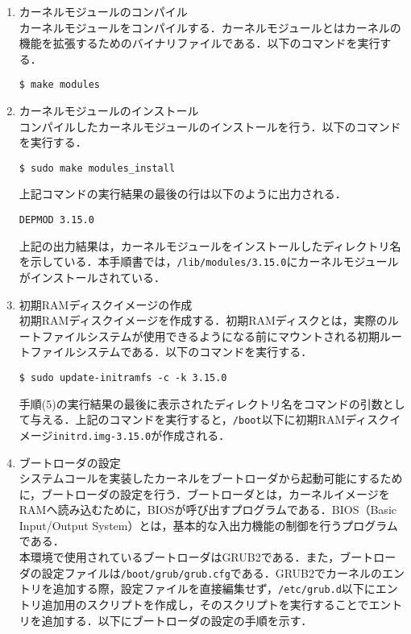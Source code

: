 \documentclass[12pt]{jsarticle}
\begin{document}
\begin{enumerate}
\item カーネルモジュールのコンパイル \\
  カーネルモジュールをコンパイルする．カーネルモジュールとはカーネルの機能を拡張するためのバイナリファイルである．以下のコマンドを実行する．

\begin{verbatim}
$ make modules
\end{verbatim}
  
\item カーネルモジュールのインストール \\
  コンパイルしたカーネルモジュールのインストールを行う．以下のコマンドを実行する．

\begin{verbatim}
$ sudo make modules_install
\end{verbatim}
上記コマンドの実行結果の最後の行は以下のように出力される．

\begin{verbatim}
DEPMOD 3.15.0
\end{verbatim}
上記の出力結果は，カーネルモジュールをインストールしたディレクトリ名を示している．本手順書では，\verb|/lib/modules/3.15.0|にカーネルモジュールがインストールされている．

\item 初期RAMディスクイメージの作成 \\
  初期RAMディスクイメージを作成する．初期RAMディスクとは，実際のルートファイルシステムが使用できるようになる前にマウントされる初期ルートファイルシステムである．以下のコマンドを実行する．

\begin{verbatim}
$ sudo update-initramfs -c -k 3.15.0
\end{verbatim}
手順(5)の実行結果の最後に表示されたディレクトリ名をコマンドの引数として与える．上記のコマンドを実行すると，\verb|/boot|以下に初期RAMディスクイメージ\verb|initrd.img-3.15.0|が作成される．

\item ブートローダの設定 \\
  システムコールを実装したカーネルをブートローダから起動可能にするために，ブートローダの設定を行う．ブートローダとは，カーネルイメージをRAMへ読み込むために，BIOSが呼び出すプログラムである．BIOS（Basic Input/Output System）とは，基本的な入出力機能の制御を行うプログラムである\cite{daniel2007}．\\
  本環境で使用されているブートローダはGRUB2である．また，ブートローダの設定ファイルは\verb|/boot/grub/grub.cfg|である．GRUB2でカーネルのエントリを追加する際，設定ファイルを直接編集せず，\verb|/etc/grub.d|以下にエントリ追加用のスクリプトを作成し，そのスクリプトを実行することでエントリを追加する．以下にブートローダの設定の手順を示す．
  

\end{enumerate}
\end{document}
